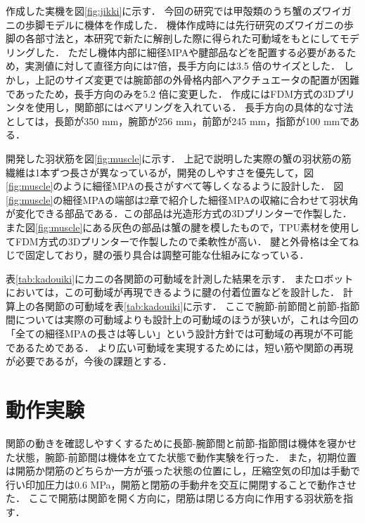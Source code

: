 \documentclass{jarticle}
\begin{document}
作成した実機を図\ref{fig:jikki}に示す．
今回の研究では甲殻類のうち蟹のズワイガニの歩脚モデルに機体を作成した．
機体作成時には先行研究\cite{crabrobot2}のズワイガニの歩脚の各部寸法と，本研究で新たに解剖した際に得られた可動域をもとにしてモデリングした．
ただし機体内部に細径MPAや腱部品などを配置する必要があるため，実測値に対して直径方向には7倍，長手方向には3.5 倍のサイズとした．
しかし，上記のサイズ変更では腕節部の外骨格内部へアクチュエータの配置が困難であったため，長手方向のみを5.2 倍に変更した．
作成にはFDM方式の3Dプリンタを使用し，関節部にはベアリングを入れている．
長手方向の具体的な寸法としては，長節が350 mm，腕節が256 mm，前節が245 mm，指節が100 mmである．

開発した羽状筋を図\ref{fig:muscle}に示す．
上記で説明した実際の蟹の羽状筋の筋繊維は1本ずつ長さが異なっているが，開発のしやすさを優先して，図\ref{fig:muscle}のように細径MPAの長さがすべて等しくなるように設計した．
図\ref{fig:muscle}の細径MPAの端部は2章で紹介した細径MPAの収縮に合わせて羽状角が変化できる部品である．この部品は光造形方式の3Dプリンターで作製した．
また図\ref{fig:muscle}にある灰色の部品は蟹の腱を模したもので，TPU素材を使用してFDM方式の3Dプリンターで作製したので柔軟性が高い．
腱と外骨格は全てねじで固定しており，腱の張り具合は調整可能な仕組みになっている．

表\ref{tab:kadouiki}にカニの各関節の可動域を計測した結果を示す．
またロボットにおいては，この可動域が再現できるように腱の付着位置などを設計した．
計算上の各関節の可動域を表\ref{tab:kadouiki}に示す．
ここで腕節-前節間と前節-指節間については実際の可動域よりも設計上の可動域のほうが狭いが，これは今回の「全ての細径MPAの長さは等しい」という設計方針では可動域の再現が不可能であるためである．
より広い可動域を実現するためには，短い筋や関節の再現が必要であるが，今後の課題とする．


\section{動作実験}
関節の動きを確認しやすくするために長節-腕節間と前節-指節間は機体を寝かせた状態，腕節-前節間は機体を立てた状態で動作実験を行った．
また，初期位置は開筋か閉筋のどちらか一方が張った状態の位置にし，圧縮空気の印加は手動で行い印加圧力は0.6 MPa，開筋と閉筋の手動弁を交互に開閉することで動作させた．
ここで開筋は関節を開く方向に，閉筋は閉じる方向に作用する羽状筋を指す．
\end{document}
